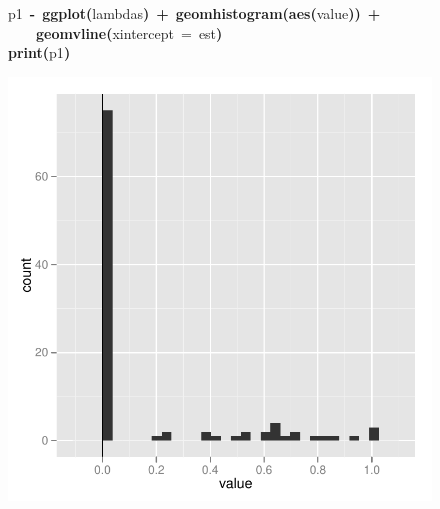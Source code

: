 \documentclass{elsarticle}
\makeatletter
\newcommand{\hlfunctioncall}[1]{\textcolor[rgb]{.5,0,.33}{\textbf{#1}}}%
\newcommand{\hlkeyword}[1]{\textbf{#1}}%
\newcommand{\hlargument}[1]{\textcolor[rgb]{.69,.25,.02}{#1}}%
\newcommand{\hlassignement}[1]{\textbf{#1}}%
\newcommand{\hlsymbol}[1]{#1}%
\newcommand{\hlstd}[1]{\textcolor[rgb]{0,0,0}{#1}}%
\newenvironment{kframe}{%
 \def\FrameCommand##1{\hskip\@totalleftmargin \hskip-\fboxsep
 \colorbox{shadecolor}{##1}\hskip-\fboxsep
     \hskip-\linewidth \hskip-\@totalleftmargin \hskip\columnwidth}%
 \MakeFramed {\advance\hsize-\width
   \@totalleftmargin\z@ \linewidth\hsize
   \@setminipage}}%
 {\par\unskip\endMakeFramed}
\newenvironment{knitrout}{}{} %
\makeatother
\begin{document}
\begin{figure}
\begin{center}
\begin{knitrout}
\color{fgcolor}\begin{kframe}
\begin{flushleft}
\ttfamily\noindent
\hlsymbol{p1}{\ }\hlassignement{\usebox{\hlnormalsizeboxlessthan}-}{\ }\hlfunctioncall{ggplot}\hlkeyword{(}\hlsymbol{lambdas}\hlkeyword{)}{\ }\hlkeyword{+}{\ }\hlfunctioncall{geom\usebox{\hlnormalsizeboxunderscore}histogram}\hlkeyword{(}\hlfunctioncall{aes}\hlkeyword{(}\hlsymbol{value}\hlkeyword{)}\hlkeyword{)}{\ }\hlkeyword{+}\hspace*{\fill}\\
\hlstd{}{\ }{\ }{\ }{\ }\hlfunctioncall{geom\usebox{\hlnormalsizeboxunderscore}vline}\hlkeyword{(}\hlargument{xintercept}{\ }\hlargument{=}{\ }\hlsymbol{est}\hlkeyword{)}\hspace*{\fill}\\
\hlstd{}\hlfunctioncall{print}\hlkeyword{(}\hlsymbol{p1}\hlkeyword{)}\mbox{}
\normalfont
\end{flushleft}


{\centering \includegraphics{Fig1a} 

}

\end{kframe}
\end{knitrout}

\end{center}
\label{fig:onea}
\end{figure}
\end{document}
